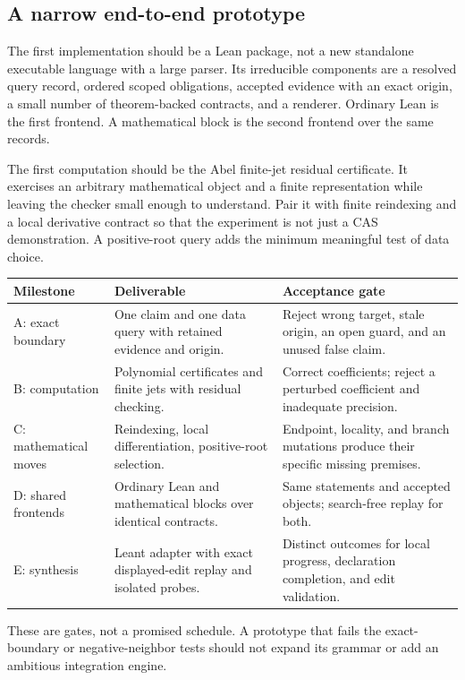 \documentclass[11pt,a4paper]{article}
\theoremstyle{definition}
\begin{document}
\subsection{A narrow end-to-end prototype}
The first implementation should be a Lean package, not a new standalone executable language with a large parser. Its irreducible components are a resolved query record, ordered scoped obligations, accepted evidence with an exact origin, a small number of theorem-backed contracts, and a renderer. Ordinary Lean is the first frontend. A mathematical block is the second frontend over the same records.

The first computation should be the Abel finite-jet residual certificate. It exercises an arbitrary mathematical object and a finite representation while leaving the checker small enough to understand. Pair it with finite reindexing and a local derivative contract so that the experiment is not just a CAS demonstration. A positive-root query adds the minimum meaningful test of data choice.

\begin{tabularx}{\textwidth}{@{}P{.18\textwidth}YP{.29\textwidth}@{}}
\toprule
Milestone & Deliverable & Acceptance gate\\
\midrule
A: exact boundary & One claim and one data query with retained evidence and origin. & Reject wrong target, stale origin, an open guard, and an unused false claim.\\
B: computation & Polynomial certificates and finite jets with residual checking. & Correct coefficients; reject a perturbed coefficient and inadequate precision.\\
C: mathematical moves & Reindexing, local differentiation, positive-root selection. & Endpoint, locality, and branch mutations produce their specific missing premises.\\
D: shared frontends & Ordinary Lean and mathematical blocks over identical contracts. & Same statements and accepted objects; search-free replay for both.\\
E: synthesis & Leant adapter with exact displayed-edit replay and isolated probes. & Distinct outcomes for local progress, declaration completion, and edit validation.\\
\bottomrule
\end{tabularx}

These are gates, not a promised schedule. A prototype that fails the exact-boundary or negative-neighbor tests should not expand its grammar or add an ambitious integration engine.
\end{document}
